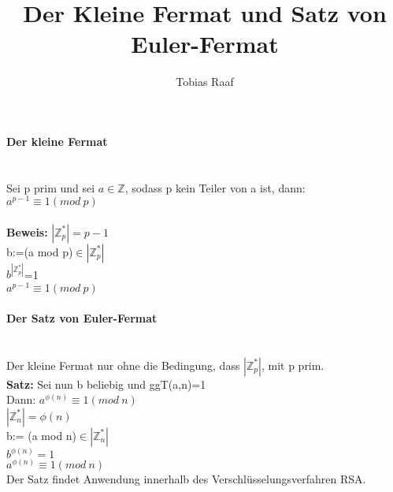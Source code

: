 \documentclass{scrartcl}
\title{Der Kleine Fermat und Satz von Euler-Fermat}
\author{Tobias Raaf}
\begin{document}
	\large \textbf{Der kleine Fermat}\\\\
	\normalsize\\ Sei p prim und sei $a\in \mathbb{Z}$, sodass p kein Teiler von a ist, dann:\\
	$a^{p-1}\equiv 1 (mod~p)$\\\\
	\textbf{Beweis:} $|\mathbb{Z}_{p}^{*}|=p-1$\\
	b:=(a mod p)$\in |\mathbb{Z}_{p}^{*}|$\\
	$b^{|\mathbb{Z}_{p}^{*}|}$=1\\
	$a^{p-1}\equiv 1(mod~p)$\\
	\\\large \textbf{Der Satz von Euler-Fermat}\\\\
	\normalsize\\Der kleine Fermat nur ohne die Bedingung, dass $|\mathbb{Z}_{p}^{*}|$, mit p prim.\\ 
	\textbf{Satz:} Sei nun b beliebig und ggT(a,n)=1\\
	Dann: $a^{\phi(n)}\equiv 1 (mod~n)$\\
	$|\mathbb{Z}_{n}^{*}|=\phi(n)$\\
	b:= (a mod n)$\in$$|\mathbb{Z}_{n}^{*}|$\\
	$b^{\phi(n)}= 1$\\
	$a^{\phi(n)}\equiv 1(mod~n)$\\
	Der  Satz findet Anwendung innerhalb des Verschlüsselungsverfahren RSA.
\end{document}
